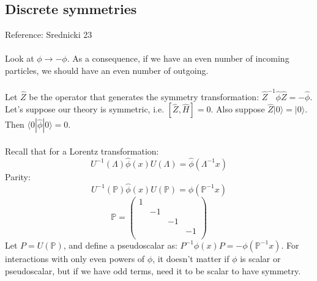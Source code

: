 \documentclass[12 pt]{article}
\begin{document}
\subsection*{Discrete symmetries}
Reference: Srednicki 23
\\
\\
Look at $\phi \to -\phi$. As a consequence, if we have an even number of incoming particles, we should have an even number of outgoing.
\\
\\
Let $\hat Z$ be the operator that generates the symmetry transformation: $\hat Z^{-1} \hat \phi \hat Z = - \hat \phi$. Let's suppose our theory is symmetric, i.e. $[\hat Z, \hat H] = 0$. Also suppose $\hat Z |0\rangle = |0\rangle$. Then $\langle 0| \hat \phi |0 \rangle = 0$.
\\
\\
Recall that for a Lorentz transformation:
\[     U^{-1} (\Lambda) \hat \phi(x) U(\Lambda) = \hat \phi(\Lambda^{-1} x)    \]
Parity:
\[     U^{-1} (\mathbb{P}) \hat \phi(x) U(\mathbb{P}) = \hat \phi(\mathbb{P}^{-1} x)    \]
\[     \mathbb{P} = \left(  \begin{array} {cccc}   1 & & & \\ & -1 & & \\ & & -1 & \\ & & & -1 \\   \end{array}  \right)          \]
Let $P = U(\mathbb{P})$, and define a pseudoscalar as: $P^{-1} \phi (x) P = - \phi(\mathbb{P}^{-1} x)$. For interactions with only even powers of $\phi$, it doesn't matter if $\phi$ is scalar or pseudoscalar, but if we have odd terms, need it to be scalar to have symmetry.
\end{document}
